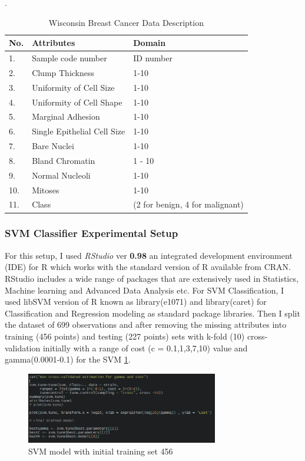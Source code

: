 \documentclass[conference]{IEEEtran}
\begin{document}
\begin{table}[h!]
	\center
	\caption{Wisconsin Breast Cancer Data Description}.
\label{table:Dataset}
\begin{tabular}{l|ll} 
		\hline
		\textbf{No.} & \textbf{Attributes} & \textbf{Domain} \\ 
		\hline 
		1.       &Sample code number  &ID number                 \\
		2.       &Clump Thickness     &1-10 \\
		3.       &Uniformity of Cell Size    & 1-10\\
		4.       &Uniformity of Cell Shape    & 1-10 \\
		5.       &Marginal Adhesion           &1-10 \\
		6.       &Single Epithelial Cell Size  & 1-10 \\
		7.       &Bare Nuclei                &1-10        \\
		8.       &Bland Chromatin             &1 - 10 \\
		9.       &Normal Nucleoli             &1-10 \\
		10.      &Mitoses                     &1-10      \\
		11.      &Class &(2 for benign, 4 for malignant)    \\
		\hline
	\end{tabular}
\end{table}


\subsubsection{SVM Classifier Experimental Setup}
For this setup, I used \textit{RStudio} ver \textbf{0.98} an integrated development environment (IDE) for R which works with the standard version of R available from CRAN. RStudio includes a wide range of packages that are extensively used in Statistics, Machine learning and Advanced Data Analysis etc. For SVM Classification, I used libSVM version of R known as library(e1071) and library(caret) for Classification and Regression modeling as standard package libraries. Then I split the dataset of 699 observations and after removing the missing attributes into training (456 points) and testing (227 points) sets with k-fold (10) cross-validation initially with a range of cost (c = 0.1,1,3,7,10) value and gamma(0.0001-0.1) for the SVM \ref{fig:svm_train}.

\begin{figure}[h]
\centering
\includegraphics[width=3.3in]{figs/svm_train.png}
\caption{SVM model with initial training set 456}
\label{fig:svm_train} 
\end{figure}
\end{document}
